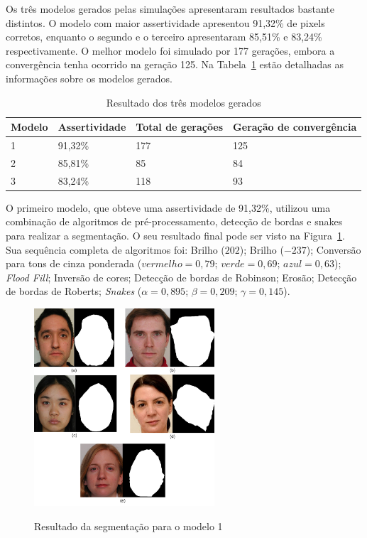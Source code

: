 \documentclass[12pt,oneside,a4paper,english,french,spanish,brazil,]{abntex2}
\begin{document}
Os três modelos gerados pelas simulações apresentaram resultados bastante distintos. O modelo com maior assertividade apresentou 91,32\% de pixels corretos, enquanto o segundo e o terceiro apresentaram 85,51\% e 83,24\% respectivamente. O melhor modelo foi simulado por 177 gerações, embora a convergência tenha ocorrido na geração 125. Na Tabela~\ref{tab:ModelosGerados} estão detalhadas as informações sobre os modelos gerados.

\begin{table}[]
\centering
\caption{Resultado dos três modelos gerados}
\label{tab:ModelosGerados}
\begin{tabular}{llll}
\hline
\textbf{Modelo} & \textbf{Assertividade} & \textbf{Total de gerações} & \textbf{Geração de convergência} \\ \hline
1               & 91,32\%                & 177                        & 125                              \\
2               & 85,81\%                  & 85                         & 84                               \\
3               & 83,24\%                  & 118                        & 93                               \\ \hline
\end{tabular}
\end{table}

O primeiro modelo, que obteve uma assertividade de 91,32\%, utilizou uma combinação de algoritmos de pré-processamento, detecção de bordas e snakes para realizar a segmentação. O seu resultado final pode ser visto na Figura~\ref{fig:DES_Resultado_1}. Sua sequência completa de algoritmos foi: Brilho (\(202\)); Brilho (\(-237\)); Conversão para tons de cinza ponderada (\(vermelho = 0,79\); \(verde = 0,69\); \(azul = 0,63\)); \textit{Flood Fill}; Inversão de cores; Detecção de bordas de Robinson; Erosão; Detecção de bordas de Roberts; \textit{Snakes} (\(\alpha = 0,895\); \(\beta = 0,209\); \(\gamma = 0,145\)).

\begin{figure}[ht]
\centering
\caption{Resultado da segmentação para o modelo 1}
\includegraphics[width=0.6\textwidth]{imagens/DES_Resultado_1.pdf}
\sourceAuthor{}
\label{fig:DES_Resultado_1}
\end{figure}
\end{document}
